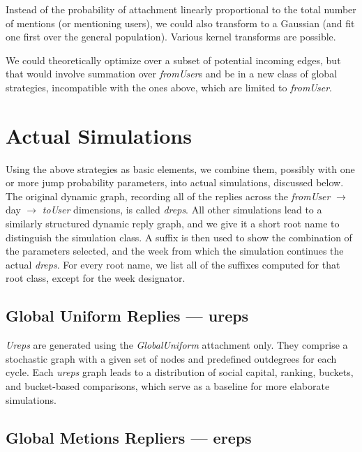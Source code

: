 \documentclass[10pt,oneside]{memoir}
\begin{document}
Instead of the probability of attachment linearly proportional to the total number of mentions (or mentioning users), we could also transform to a Gaussian (and fit one first over the general population).  Various kernel transforms are possible.


We could theoretically optimize over a subset of potential incoming edges, but that would involve summation over \emph{fromUser}s and be in a new class of global strategies, incompatible with the ones above, which are limited to {\itshape fromUser}.


\pagebreak \section{Actual Simulations}
\label{actualsimulations}

Using the above strategies as basic elements, we combine them, possibly with one or more jump probability parameters, into actual simulations, discussed below.  The original dynamic graph, recording all of the replies across the {\itshape fromUser} $\rightarrow$ day $\rightarrow$ {\itshape toUser} dimensions, is called {\itshape dreps}.  All other simulations lead to a similarly structured dynamic reply graph, and we give it a short root name to distinguish the simulation class.  A suffix is then used to show the combination of the parameters selected, and the week from which the simulation continues the actual {\itshape dreps}.  For every root name, we list all of the suffixes computed for that root class, except for the week designator.


\subsection{Global Uniform Replies --- ureps}
\label{globaluniformrepliesureps}

{\itshape Ureps} are generated using the {\itshape GlobalUniform} attachment only.  They comprise a stochastic graph with a given set of nodes and predefined outdegrees for each cycle.  Each {\itshape ureps} graph leads to a distribution of social capital, ranking, buckets, and bucket-based comparisons, which serve as a baseline for more elaborate simulations.


\subsection{Global Metions Repliers --- ereps}
\label{globalmetionsrepliersereps}
\end{document}
